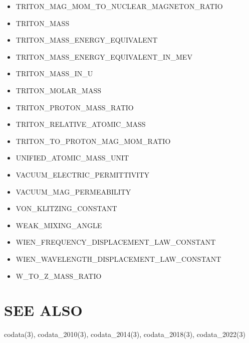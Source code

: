 \begin{itemize}
\item TRITON\_MAG\_MOM\_TO\_NUCLEAR\_MAGNETON\_RATIO
\item TRITON\_MASS
\item TRITON\_MASS\_ENERGY\_EQUIVALENT
\item TRITON\_MASS\_ENERGY\_EQUIVALENT\_IN\_MEV
\item TRITON\_MASS\_IN\_U
\item TRITON\_MOLAR\_MASS
\item TRITON\_PROTON\_MASS\_RATIO
\item TRITON\_RELATIVE\_ATOMIC\_MASS
\item TRITON\_TO\_PROTON\_MAG\_MOM\_RATIO
\item UNIFIED\_ATOMIC\_MASS\_UNIT
\item VACUUM\_ELECTRIC\_PERMITTIVITY
\item VACUUM\_MAG\_PERMEABILITY
\item VON\_KLITZING\_CONSTANT
\item WEAK\_MIXING\_ANGLE
\item WIEN\_FREQUENCY\_DISPLACEMENT\_LAW\_CONSTANT
\item WIEN\_WAVELENGTH\_DISPLACEMENT\_LAW\_CONSTANT
\item W\_TO\_Z\_MASS\_RATIO
\end{itemize}

\section*{SEE ALSO}
codata(3), codata\_2010(3), codata\_2014(3), codata\_2018(3), codata\_2022(3)

